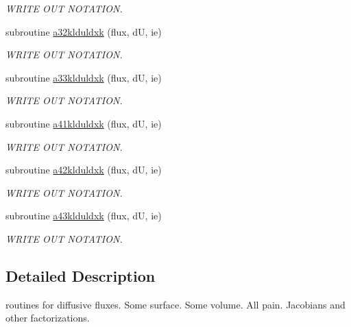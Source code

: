 \begin{DoxyCompactItemize}
\begin{DoxyCompactList}\small\item\em W\-R\-I\-T\-E O\-U\-T N\-O\-T\-A\-T\-I\-O\-N. \end{DoxyCompactList}\item 
\hypertarget{group__vfjac_ga2a280e4b1d5fbba00356ca9120709fa0}{subroutine \hyperlink{group__vfjac_ga2a280e4b1d5fbba00356ca9120709fa0}{a32klduldxk} (flux, d\-U, ie)}\label{group__vfjac_ga2a280e4b1d5fbba00356ca9120709fa0}

\begin{DoxyCompactList}\small\item\em W\-R\-I\-T\-E O\-U\-T N\-O\-T\-A\-T\-I\-O\-N. \end{DoxyCompactList}\item 
\hypertarget{group__vfjac_ga4b542714fa89c4288fa5846a11cc28b1}{subroutine \hyperlink{group__vfjac_ga4b542714fa89c4288fa5846a11cc28b1}{a33klduldxk} (flux, d\-U, ie)}\label{group__vfjac_ga4b542714fa89c4288fa5846a11cc28b1}

\begin{DoxyCompactList}\small\item\em W\-R\-I\-T\-E O\-U\-T N\-O\-T\-A\-T\-I\-O\-N. \end{DoxyCompactList}\item 
\hypertarget{group__vfjac_ga8b5ee49aa820086e3596a1a91e9dc799}{subroutine \hyperlink{group__vfjac_ga8b5ee49aa820086e3596a1a91e9dc799}{a41klduldxk} (flux, d\-U, ie)}\label{group__vfjac_ga8b5ee49aa820086e3596a1a91e9dc799}

\begin{DoxyCompactList}\small\item\em W\-R\-I\-T\-E O\-U\-T N\-O\-T\-A\-T\-I\-O\-N. \end{DoxyCompactList}\item 
\hypertarget{group__vfjac_ga7cf0c00202b223c51bed9c61c7937bc6}{subroutine \hyperlink{group__vfjac_ga7cf0c00202b223c51bed9c61c7937bc6}{a42klduldxk} (flux, d\-U, ie)}\label{group__vfjac_ga7cf0c00202b223c51bed9c61c7937bc6}

\begin{DoxyCompactList}\small\item\em W\-R\-I\-T\-E O\-U\-T N\-O\-T\-A\-T\-I\-O\-N. \end{DoxyCompactList}\item 
\hypertarget{group__vfjac_ga7d4c71aaaae94de9cd5f41a93836699a}{subroutine \hyperlink{group__vfjac_ga7d4c71aaaae94de9cd5f41a93836699a}{a43klduldxk} (flux, d\-U, ie)}\label{group__vfjac_ga7d4c71aaaae94de9cd5f41a93836699a}

\begin{DoxyCompactList}\small\item\em W\-R\-I\-T\-E O\-U\-T N\-O\-T\-A\-T\-I\-O\-N. \end{DoxyCompactList}\end{DoxyCompactItemize}


\subsection{Detailed Description}
routines for diffusive fluxes. Some surface. Some volume. All pain. Jacobians and other factorizations. 
